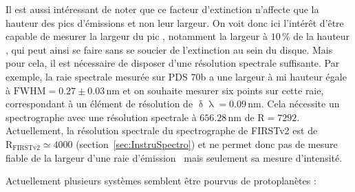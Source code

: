 Il est aussi intéressant de noter que ce facteur d'extinction n'affecte que la hauteur des pics d'émissions et non leur largeur. On voit donc ici l'intérêt d'être capable de mesurer la largeur du pic \ha, notamment la largeur à $10 \, \%$ de la hauteur \Wd, qui peut ainsi se faire sans se soucier de l'extinction au sein du disque. Mais pour cela, il est nécessaire de disposer d'une résolution spectrale suffisante. Par exemple, la raie spectrale mesurée sur PDS 70b \citep{haffert2019} a une largeur à mi hauteur égale à $\text{FWHM} = 0.27 \pm 0.03 \,$nm et on souhaite mesurer six points sur cette raie, correspondant à un élément de résolution de $\updelta\uplambda = 0.09 \,$nm. Cela nécessite un spectrographe avec une résolution spectrale à $656.28 \,$nm de $\text{R} = 7292$. Actuellement, la résolution spectrale du spectrographe de \ac{FIRSTv2} est de $\text{R}_{\text{FIRSTv2}} \simeq 4000$ (section~\ref{sec:InstruSpectro}) et ne permet donc pas de mesure fiable de la largeur d'une raie d'émission \ha~mais seulement sa mesure d'intensité.

Actuellement plusieurs systèmes semblent être pourvus de protoplanètes : 

